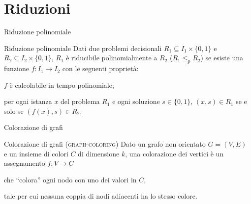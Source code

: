 \section{Riduzioni}

\begin{frame}{Riduzione polinomiale}

\vspace{-9pt}
\begin{block}{Riduzione polinomiale}
Dati due problemi decisionali $R_1 \subseteq I_1 \times \{ 0,1 \}$ e
$R_2 \subseteq I_2 \times \{ 0,1 \}$, $R_1$ è \alert{riducibile polinomialmente} a $R_2$ (\alert{$R_1 \leq_p R_2$}) se esiste una funzione
$f: I_1 \rightarrow I_2$ con le seguenti proprietà:
\BI
\item $f$ è calcolabile in tempo polinomiale;
\item per ogni istanza $x$ del problema $R_1$ e
  ogni soluzione $s \in \{ 0,1 \}$, 
  $(x,s) \in R_1$ se e solo se $(f(x),s) \in R_2$.
\EI
\end{block}


\end{frame}

\begin{frame}{Colorazione di grafi}

\vspace{-9pt}
\begin{block}{Colorazione di grafi (\textsc{graph-coloring})}
Dato un grafo non orientato $G=(V,E)$ e un insieme di colori $C$
di dimensione $k$, una \alert{colorazione} dei vertici è un assegnamento  $f: V \rightarrow C$
\BI
\item che ``colora'' ogni nodo con uno dei valori in $C$, 
\item tale per cui nessuna coppia di nodi adiacenti ha lo stesso colore.
\EI
\end{block}

\vspace{-12pt}
\end{frame}

